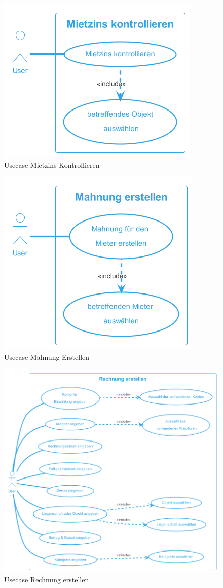 \begin{figure}[H]
  \begin{center}
    \includegraphics[width=0.4\linewidth]{content/diagrams/out/usecase/mietzinsKontrollieren/MietzinsKontrollieren.png}
    \caption{Usecase Mietzins Kontrollieren}
  \end{center}
  \label{MietzinsKontrollieren}
\end{figure}

\begin{figure}[H]
  \begin{center}
    \includegraphics[width=0.4\linewidth]{content/diagrams/out/usecase/mahnungGenerieren/MahnungErstellen.png}
    \caption{Usecase Mahnung Erstellen}
  \end{center}
  \label{mahnung}
\end{figure}

\begin{figure}[H]
  \begin{center}
    \includegraphics[width=0.8\linewidth]{content/diagrams/out/usecase/rechnungErstellen/Rechnung erstellen.png}
    \caption{Usecase Rechnung erstellen}
  \end{center}
  \label{RechnungErstellen}
\end{figure}

